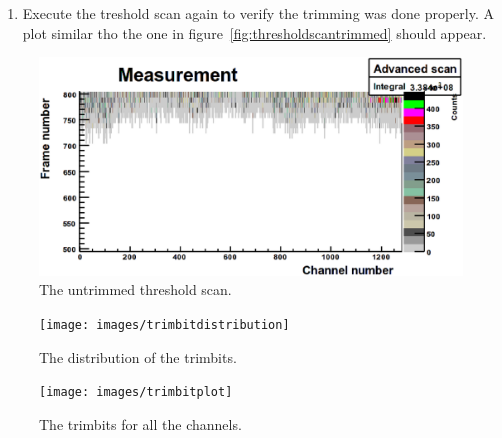 \begin{enumerate}
Click on \textit{Trim} to start the noise trimming process. After the trimming has finished look at the plot and the distribution of the trim bits. The distribution should be around 32$\pm$5 and should look gaussian. An example distribution is shown in figure~\ref{fig:trimdistribution} and an example plot in~\ref{fig:trimplot}. If the distribution is too much off center change the counts/pixel, if it is too narrow reduce the resolution (set it to 3), if it is too wide increase it (set it to 5). Make sure not too many channels have a trim value of 0 or 63.
\item Execute the treshold scan again to verify the trimming was done properly. A plot similar tho the one in figure~\ref{fig:thresholdscantrimmed} should appear.
\end{enumerate}

\begin{figure}
\begin{center}
\includegraphics[width=\textwidth]{images/noise_thresholdscanuntrimmed}
\end{center}
\caption{The untrimmed threshold scan.}\label{fig:thresholdscanuntrimmed}
\end{figure}

\begin{figure}
\begin{center}
\texttt{[image: images/trimbitdistribution]}
\end{center}
\caption{The distribution of the trimbits.}\label{fig:trimdistribution}
\end{figure}

\begin{figure}
\begin{center}
\texttt{[image: images/trimbitplot]}
\end{center}
\caption{The trimbits for all the channels.}\label{fig:trimplot}
\end{figure}


